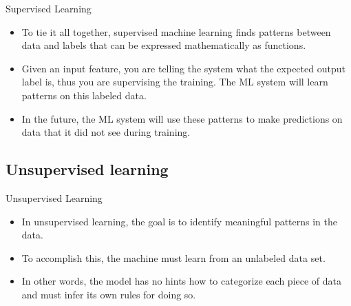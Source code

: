\documentclass{beamer}
\begin{document}

\begin{frame}{Supervised Learning}

\begin{itemize}
\item To tie it all together, supervised machine learning finds patterns between data and labels that can be expressed mathematically as functions. 

\item Given an input feature, you are telling the system what the expected output label is, thus you are supervising the training. The ML system will learn patterns on this labeled data. 

\item In the future, the ML system will use these patterns to make predictions on data that it did not see during training.

\end{itemize}

\end{frame}


%
%
%
%
%
%
%


\subsection{Unsupervised learning}

\begin{frame}{Unsupervised Learning}

\begin{itemize}

\item In unsupervised learning, the goal is to identify meaningful patterns in the data. 

\item To accomplish this, the machine must learn from an unlabeled data set. 

\item In other words, the model has no hints how to categorize each piece of data and must infer its own rules for doing so.

\end{itemize}

\end{frame}
\end{document}
